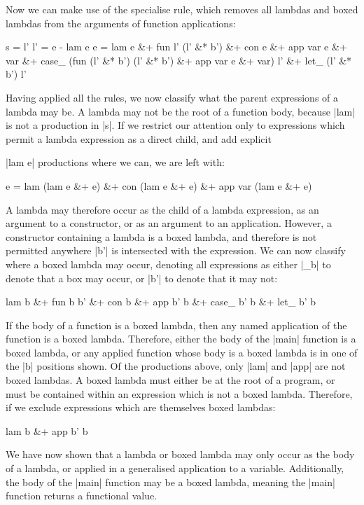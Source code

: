 \documentclass[preprint]{sigplanconf}
\begin{document}
Now we can make use of the specialise rule, which removes all lambdas and boxed lambdas from the arguments of function applications:

\ignore\begin{code}
s   = l'
l' = e - lam e
e =  lam e &+ fun l' (l' &* b') &+ con e &+ app var e &+ var &+
     case_ (fun (l' &* b') (l' &* b') &+ app var e &+ var) l' &+
     let_ (l' &* b') l'
\end{code}

Having applied all the rules, we now classify what the parent expressions of a lambda may be. A lambda may not be the root of a function body, because |lam| is not a production in |s|. If we restrict our attention only to expressions which permit a lambda expression as a direct child, and add explicit \ignore|lam e| productions where we can, we are left with:

\ignore\begin{code}
e =  lam (lam e &+ e) &+ con (lam e &+ e) &+ app var (lam e &+ e)
\end{code}

A lambda may therefore occur as the child of a lambda expression, as an argument to a constructor, or as an argument to an application. However, a constructor containing a lambda is a boxed lambda, and therefore is not permitted anywhere |b'| is intersected with the expression. We can now classify where a boxed lambda may occur, denoting all expressions as either |_b| to denote that a box may occur, or |b'| to denote that it may not:

\ignore\begin{code}
lam b &+ fun b b' &+ con b &+ app b' b &+ case_ b' b &+ let_ b' b
\end{code}

If the body of a function is a boxed lambda, then any named application of the function is a boxed lambda. Therefore, either the body of the |main| function is a boxed lambda, or any applied function whose body is a boxed lambda is in one of the |b| positions shown. Of the productions above, only |lam| and |app| are not boxed lambdas. A boxed lambda must either be at the root of a program, or must be contained within an expression which is not a boxed lambda. Therefore, if we exclude expressions which are themselves boxed lambdas:

\ignore\begin{code}
lam b &+ app b' b
\end{code}

We have now shown that a lambda or boxed lambda may only occur as the body of a lambda, or applied in a generalised application to a variable. Additionally, the body of the |main| function may be a boxed lambda, meaning the |main| function returns a functional value.
\end{document}
